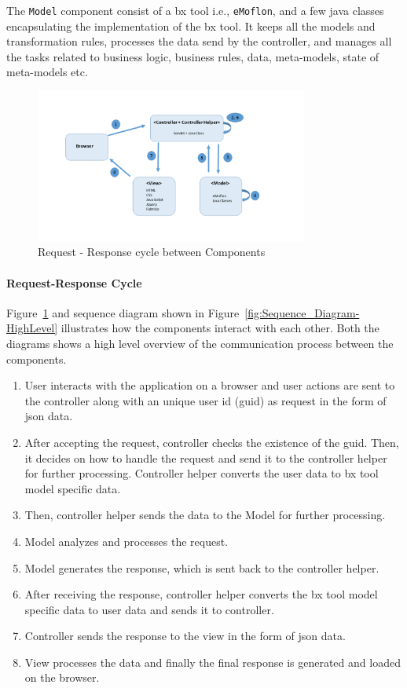 The \texttt{Model} component consist of a bx tool i.e., \texttt{eMoflon}, and a few java classes encapsulating the implementation of the bx tool. It keeps all the models and transformation rules, processes the data send by the controller, and manages all the tasks related to business logic, business rules, data, meta-models, state of meta-models etc.

\begin{figure}
	\includegraphics[width=0.8\textwidth]{figures/MVC_ReqRes}
	\caption{Request - Response cycle between Components}
	\label{fig:MVC_ReqRes}
\end{figure}

\paragraph{Request-Response Cycle} 
Figure~\ref{fig:MVC_ReqRes} and sequence diagram shown in Figure~\ref{fig:Sequence_Diagram-HighLevel} illustrates how the components interact with each other. Both the diagrams shows a high level overview of the communication process between the components.
\begin{enumerate}
	\item {User interacts with the application on a browser and user actions are sent to the controller along with an unique user id (guid) as request in the form of json data.}
	\item {After accepting the request, controller checks the existence of the guid. Then, it decides on how to handle the request and send it to the controller helper for further processing. Controller helper converts the user data to bx tool model specific data.}
	\item {Then, controller helper sends the data to the Model for further processing.}
	\item {Model analyzes and processes the request.}
	\item {Model generates the response, which is sent back to the controller helper.}
	\item {After receiving the response, controller helper converts the bx tool model specific data to user data and sends it to controller.}
	\item {Controller sends the response to the view in the form of json data.}
	\item {View processes the data and finally the final response is generated and loaded on the browser.}
\end{enumerate}

